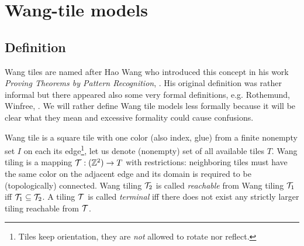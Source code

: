 \section{Wang-tile models}

\subsection{Definition}
	
	
	Wang tiles are named after Hao Wang who introduced this concept in his work {\em Proving Theorems by Pattern Recognition}, \cite{wang_tiles}. His original definition was rather informal but there appeared also some very formal definitions, e.g. Rothemund, Winfree, \cite{square_lb}. We will rather define Wang tile models less formally because it will be clear what they mean and excessive formality could cause confusions.
	
	Wang tile is a square tile with one color (also index, glue) from a finite nonempty set $I$ on each its edge\footnote{Tiles keep orientation, they are {\em not} allowed to rotate nor reflect.}, let us denote (nonempty) set of all available tiles $T$. Wang tiling is a mapping ${\cal T}: (\mathbb{Z}^2) \rightarrow T$ with restrictions: neighboring tiles must have the same color on the adjacent edge and its domain is required to be (topologically) connected. Wang tiling ${\cal T}_2$ is called {\em reachable} from Wang tiling ${\cal T}_1$ iff ${\cal T}_1 \subseteq {\cal T}_2$. A tiling $\cal T$ is called {\em terminal} iff there does not exist any strictly larger tiling reachable from $\cal T$. %
	
